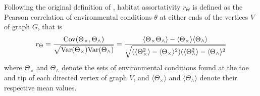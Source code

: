 Following the original definition of \cite{Newman2003a}, habitat assortativity $r_\Theta$ is defined as the Pearson correlation of environmental conditions $\theta$ at either ends of the vertices $V$ of graph $G$, that is
%
\begin{equation}\label{eqSI:def_rtheta}
  r_\Theta = \frac{\mbox{Cov}(\Theta_\times, \Theta_\wedge)}{\sqrt{{\operatorname{Var}}(\Theta_\times) {\operatorname{Var}}(\Theta_\wedge)}} 
  = \frac{\langle  \Theta_\times \Theta_\wedge \rangle - \langle  \Theta_\times \rangle \langle  \Theta_\wedge \rangle }{\sqrt{ ( \langle \Theta_\times^2 \rangle - \langle \Theta_\times \rangle^2) (  \langle \Theta_\wedge^2 \rangle - \langle \Theta_\wedge \rangle^2 }}
\end{equation}
%
where $\Theta_\times$ and $\Theta_\wedge$ denote the sets of environmental conditions found at the toe and tip of each directed vertex of graph $V$, and $\langle \Theta_\times \rangle$ and $\langle \Theta_\wedge \rangle$ denote their respective mean values. 


